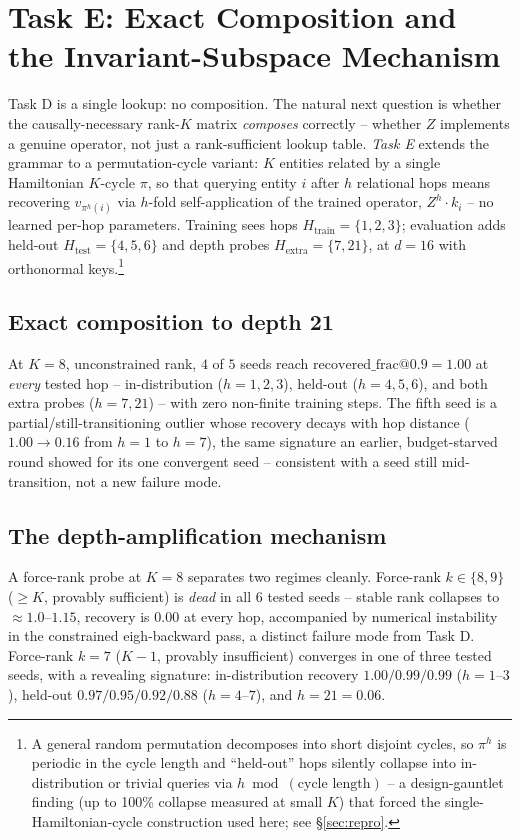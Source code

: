 \section{Task E: Exact Composition and the Invariant-Subspace Mechanism}
\label{sec:taske}

Task D is a single lookup: no composition. The natural next question is
whether the causally-necessary rank-$K$ matrix \emph{composes} correctly --
whether $Z$ implements a genuine operator, not just a rank-sufficient
lookup table. \emph{Task E} extends the grammar to a permutation-cycle
variant: $K$ entities related by a single Hamiltonian $K$-cycle $\pi$, so
that querying entity $i$ after $h$ relational hops means recovering
$v_{\pi^h(i)}$ via $h$-fold self-application of the trained operator,
$Z^h\cdot k_i$ -- no learned per-hop parameters. Training sees hops
$H_{\mathrm{train}}=\{1,2,3\}$; evaluation adds held-out
$H_{\mathrm{test}}=\{4,5,6\}$ and depth probes
$H_{\mathrm{extra}}=\{7,21\}$, at $d=16$ with orthonormal keys.\footnote{A
general random permutation decomposes into short disjoint cycles, so
$\pi^h$ is periodic in the cycle length and ``held-out'' hops silently
collapse into in-distribution or trivial queries via $h\bmod(\text{cycle
length})$ -- a design-gauntlet finding (up to 100\% collapse measured at
small $K$) that forced the single-Hamiltonian-cycle construction used
here; see \S\ref{sec:repro}.}

\subsection{Exact composition to depth 21}
\label{sec:taske-headline}

At $K{=}8$, unconstrained rank, $4$ of $5$ seeds reach
$\mathrm{recovered\_frac@0.9}=1.00$ at \emph{every} tested hop --
in-distribution ($h{=}1,2,3$), held-out ($h{=}4,5,6$), and both extra
probes ($h{=}7,21$) -- with zero non-finite training steps. The fifth seed
is a partial/still-transitioning outlier whose recovery decays with hop
distance ($1.00\to0.16$ from $h{=}1$ to $h{=}7$), the same signature an
earlier, budget-starved round showed for its one convergent seed --
consistent with a seed still mid-transition, not a new failure mode.

\subsection{The depth-amplification mechanism}
\label{sec:taske-depth}

A force-rank probe at $K{=}8$ separates two regimes cleanly. Force-rank
$k\in\{8,9\}$ ($\geq K$, provably sufficient) is \emph{dead} in all 6 tested
seeds -- stable rank collapses to $\approx1.0$--$1.15$, recovery is $0.00$
at every hop, accompanied by numerical instability in the constrained
eigh-backward pass, a distinct failure mode from Task D. Force-rank
$k{=}7$ ($K{-}1$, provably insufficient) converges in one of three tested
seeds, with a revealing signature: in-distribution recovery $1.00/0.99/0.99$
($h{=}1$--$3$), held-out $0.97/0.95/0.92/0.88$ ($h{=}4$--$7$), and
\textbf{$h{=}21 = 0.06$}.

